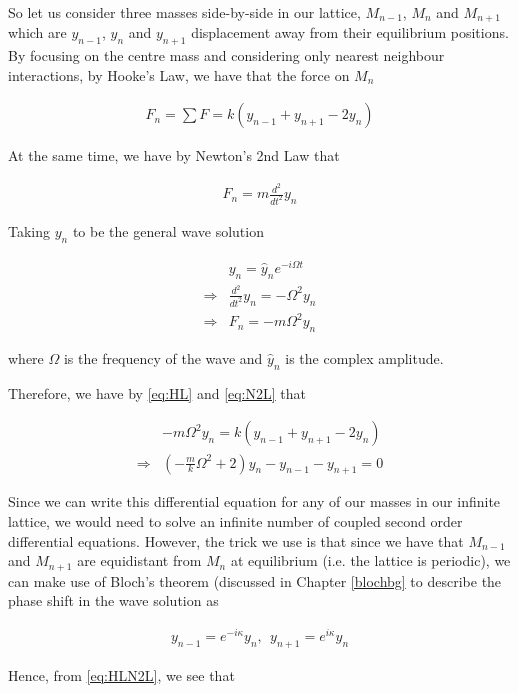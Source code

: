 So let us consider three masses side-by-side in our lattice, $M_{n-1}$, $M_n$
and $M_{n+1}$ which are $y_{n-1}$, $y_n$ and $y_{n+1}$ displacement away from
their equilibrium positions. By focusing on the centre mass and considering
only nearest neighbour interactions, by Hooke's Law, we have that the force on
$M_n$

\begin{align}
  F_{n}=\sum F=k\left(y_{n-1}+y_{n+1}-2y_{n}\right) \label{eq:HL}
\end{align}

At the same time, we have by Newton's 2nd Law that

\begin{align}
  F_{n}=m\frac{d^{2}}{dt^{2}}y_{n}
\end{align}

Taking $y_n$ to be the general wave solution

\begin{align}
  &y_{n}=\hat{y}_{n}e^{-i\Omega t} \\
  \Rightarrow &\frac{d^{2}}{dt^{2}}y_{n}=-\Omega^{2}y_{n} \\
  \Rightarrow &F_{n}=-m\Omega^{2}y_{n} \label{eq:N2L}
\end{align}

where $\Omega$ is the frequency of the wave and $\hat{y}_{n}$ is the complex
amplitude.

Therefore, we have by \eqref{eq:HL} and \eqref{eq:N2L} that

\begin{align}
  &-m\Omega^{2}y_{n}=k\left(y_{n-1}+y_{n+1}-2y_{n}\right) \\
  \Rightarrow &\left(-\frac{m}{k}\Omega^{2}+2\right)y_{n}-y_{n-1}-y_{n+1}=0
    \label{eq:HLN2L}
\end{align}

Since we can write this differential equation for any of our masses in our
infinite lattice, we would need to solve an infinite number of coupled second
order differential equations. However, the trick we use is that since we have
that $M_{n-1}$ and $M_{n+1}$ are equidistant from $M_{n}$ at equilibrium (i.e.
the lattice is periodic), we can make use of Bloch's theorem (discussed in
Chapter \ref{blochbg} to describe the phase shift in the wave solution as

\begin{align}
  y_{n-1}=e^{-i\kappa}y_n,\ \ y_{n+1}=e^{i\kappa}y_n
\end{align}

Hence, from \eqref{eq:HLN2L}, we see that

